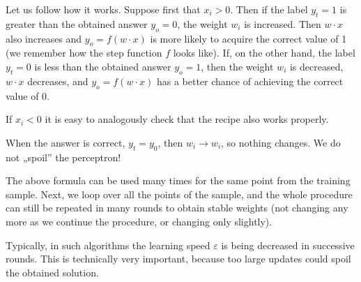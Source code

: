 \documentclass[a4paper,12pt,polish]{jupyterBook}
\begin{document}
\sphinxAtStartPar
Let us follow how it works. Suppose first that \( x_i> 0\). Then if the label \( y_t = 1 \) is greater than the obtained answer \( y_o = 0\), the weight \(w_i\) is increased. Then \( w \cdot x \) also increases and \( y_o = f (w \cdot x) \) is more likely to acquire the correct value of 1 (we remember how the step function \(f\) looks like). If, on the other hand, the label \( y_t = 0 \) is less than the obtained answer \( y_o = 1 \), then the weight \(w_i\) is decreased, \( w \cdot x \) decreases, and \( y_o = f (w \cdot x) \) has a better chance of achieving the correct value of 0.

\sphinxAtStartPar
If \( x_i < 0 \) it is easy to analogously check that the recipe also works properly.

\sphinxAtStartPar
When the answer is correct, \(y_t=y_0\), then \( w_i \to w_i\), so nothing changes. We do not „spoil” the perceptron!

\sphinxAtStartPar
The above formula can be used many times for the same point from the training sample. Next,  we loop over all the points of the sample, and the whole procedure can still be repeated in many rounds to obtain stable weights (not changing any more as we continue the procedure, or changing only slightly).

\sphinxAtStartPar
Typically, in such algorithms the learning speed \( \varepsilon \) is being decreased in successive rounds. This is technically very important, because too large updates could spoil the obtained solution.
\end{document}
